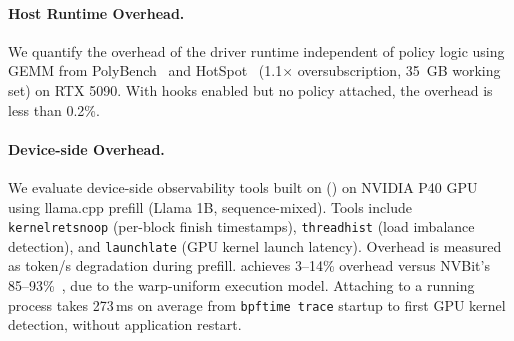 \paragraph{Host Runtime Overhead.}
We quantify the overhead of the \sys driver runtime independent of policy logic using GEMM from PolyBench~\cite{grauer2012auto} and HotSpot~\cite{che2009rodinia} (1.1$\times$ oversubscription, 35~GB working set) on RTX 5090.
With hooks enabled but no policy attached, the overhead is less than 0.2\%.


\paragraph{Device-side Overhead.}
We evaluate device-side observability tools built on \sys () on NVIDIA P40 GPU using llama.cpp prefill (Llama 1B, sequence-mixed).
Tools include \texttt{kernel\-ret\-snoop} (per-block finish timestamps), \texttt{thread\-hist} (load imbalance detection), and \texttt{launch\-late} (GPU kernel launch latency).
Overhead is measured as token/s degradation during prefill.
\sys achieves 3--14\% overhead versus NVBit's 85--93\%~\cite{villa2019nvbit}, due to the warp-uniform execution model.
Attaching to a running process takes 273\,ms on average from \texttt{bpftime trace} startup to first GPU kernel detection, without application restart.

